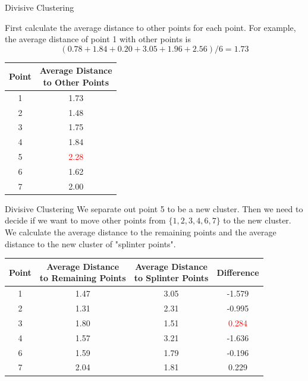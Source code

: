 \documentclass{beamer}
\begin{document}
	\begin{frame}{Divisive Clustering}
		
		First calculate the average distance to other points for each point. For example, the average distance of point 1 with other points is
		\[(0.78+1.84+0.20+3.05+1.96+2.56)/6=1.73 \]
		\begin{table}[htbp]
			\centering
			\begin{tabular}{cc}
				\toprule
				Point & \makecell{Average Distance \\ to Other Points}\\
				\midrule
				1 & 1.73 \\
				2 & 1.48 \\
				3 & 1.75 \\ 
				4 & 1.84 \\
				5 & \textcolor{red}{2.28}  \\
				6 & 1.62 \\
				7 & 2.00 \\
				\bottomrule
			\end{tabular}
		\end{table}
		
	\end{frame}
	
	\begin{frame}{Divisive Clustering}
		We separate out point 5 to be a new cluster. Then we need to decide if we want to move other points from $\{1,2,3,4,6,7 \}$ to the new cluster. We calculate the average distance to the remaining points and the average distance to the new cluster of "splinter points".
		
		\begin{table}[htbp]
			\begin{tabular}{cccc}
				\toprule
				Point & \makecell{Average Distance \\ to Remaining Points} & \makecell{Average Distance \\ to Splinter Points} & Difference\\
				\midrule
				1& 1.47 & 3.05 & -1.579\\
				2& 1.31 & 2.31 & -0.995\\
				3& 1.80 & 1.51 & \textcolor{red}{0.284}\\
				4& 1.57& 3.21 & -1.636\\
				6& 1.59 & 1.79 & -0.196\\
				7& 2.04&  1.81 & 0.229\\
				\bottomrule
			\end{tabular}
		\end{table}
	\end{frame}
\end{document}
